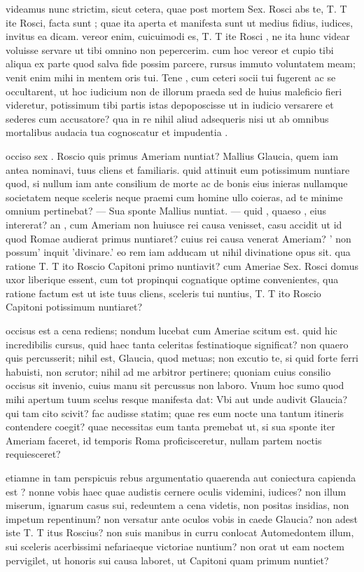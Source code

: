  videamus nunc strictim, sicut cetera, quae post mortem Sex. Rosci abs te, T. T ite Rosci, facta sunt ; quae ita aperta et manifesta sunt ut medius fidius, iudices, invitus ea dicam. vereor enim, cuicuimodi es, T. T ite Rosci , ne ita hunc videar voluisse servare ut tibi omnino non pepercerim. cum hoc vereor et cupio tibi aliqua ex parte quod salva fide possim parcere, rursus immuto voluntatem meam; venit enim mihi in mentem oris tui. Tene , cum ceteri socii tui fugerent ac se occultarent, ut hoc iudicium non de illorum praeda sed de huius maleficio fieri videretur, potissimum tibi partis istas depoposcisse ut in iudicio versarere et sederes cum accusatore? qua in re nihil aliud adsequeris nisi ut ab omnibus mortalibus audacia tua cognoscatur et impudentia .

 occiso sex . Roscio quis primus Ameriam nuntiat? Mallius Glaucia, quem iam antea nominavi, tuus cliens et familiaris. quid attinuit eum potissimum nuntiare quod, si nullum iam ante consilium de morte ac de bonis eius inieras nullamque societatem neque sceleris neque praemi cum homine ullo coieras, ad te minime omnium pertinebat? — Sua sponte Mallius nuntiat. — quid , quaeso , eius intererat? an , cum Ameriam non huiusce rei causa venisset, casu accidit ut id quod Romae audierat primus nuntiaret? cuius rei causa venerat Ameriam? ' non possum' inquit 'divinare.' eo rem iam adducam ut nihil divinatione opus sit. qua ratione T. T ito Roscio Capitoni primo nuntiavit? cum Ameriae Sex. Rosci domus uxor liberique essent, cum tot propinqui cognatique optime convenientes, qua ratione factum est ut iste tuus cliens, sceleris tui nuntius, T. T ito Roscio Capitoni potissimum nuntiaret?

 occisus est a cena rediens; nondum lucebat cum Ameriae scitum est. quid hic incredibilis cursus, quid haec tanta celeritas festinatioque significat? non quaero quis percusserit; nihil est, Glaucia, quod metuas; non excutio te, si quid forte ferri habuisti, non scrutor; nihil ad me arbitror pertinere; quoniam cuius consilio occisus sit invenio, cuius manu sit percussus non laboro. Vnum hoc sumo quod mihi apertum tuum scelus resque manifesta dat: Vbi aut unde audivit Glaucia? qui tam cito scivit? fac audisse statim; quae res eum nocte una tantum itineris contendere coegit? quae necessitas eum tanta premebat ut, si sua sponte iter Ameriam faceret, id temporis Roma proficisceretur, nullam partem noctis requiesceret?

 etiamne in tam perspicuis rebus argumentatio quaerenda aut coniectura capienda est ? nonne vobis haec quae audistis cernere oculis videmini, iudices? non illum miserum, ignarum casus sui, redeuntem a cena videtis, non positas insidias, non impetum repentinum? non versatur ante oculos vobis in caede Glaucia? non adest iste T. T itus Roscius? non suis manibus in curru conlocat Automedontem illum, sui sceleris acerbissimi nefariaeque victoriae nuntium? non orat ut eam noctem pervigilet, ut honoris sui causa laboret, ut Capitoni quam primum nuntiet?


